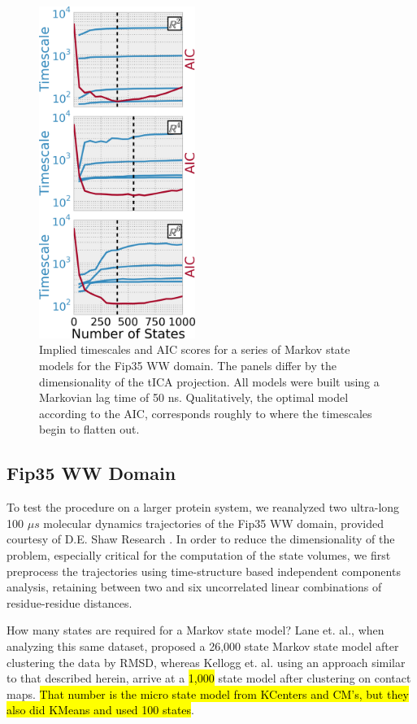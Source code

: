 \documentclass[twocolumn,floatfix,nofootinbib,aps]{revtex4-1}
\begin{document}
\begin{figure}
\centering
\includegraphics[width=2in]{figs/ww_aic_vs_time.png}
\caption{Implied timescales and AIC scores for a series of Markov state models for the Fip35 WW domain. The panels differ by the dimensionality of the tICA projection. All models were built using a Markovian lag time of 50 ns. Qualitatively, the optimal model according to the AIC, corresponds roughly to where the timescales begin to flatten out.}
\label{fig:ww}
\end{figure}

\subsection{Fip35 WW Domain}

To test the procedure on a larger protein system, we reanalyzed two ultra-long 100 $\mu s$ molecular dynamics trajectories of the Fip35 WW domain\cite{Liu2008Experimental}, provided courtesy of D.E. Shaw Research \cite{Shaw2010Atomic}. In order to reduce the dimensionality of the problem, especially critical for the computation of the state volumes, we first preprocess the trajectories using time-structure based independent components analysis\cite{Schwantes2013Improvements}, retaining between two and six uncorrelated linear combinations of residue-residue distances.

How many states are required for a Markov state model? Lane et. al., when analyzing this same dataset, proposed a 26,000 state Markov state model after clustering the data by RMSD, whereas Kellogg et. al. using an approach similar to that described herein, arrive at a \hl{1,000} state model after clustering on contact maps\cite{Lane2011Markov, Kellogg2012Evaluation}. \hl{That number is the micro state model from KCenters and CM's, but they also did KMeans and used 100 states}.
\end{document}
